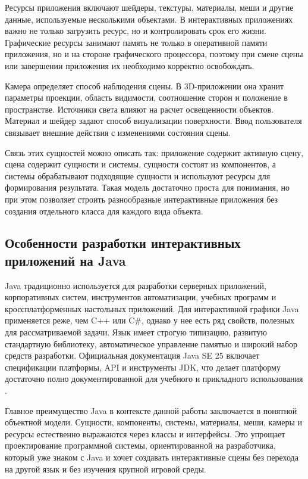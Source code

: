 Ресурсы приложения включают шейдеры, текстуры, материалы, меши и другие
данные, используемые несколькими объектами. В интерактивных приложениях
важно не только загрузить ресурс, но и контролировать срок его жизни.
Графические ресурсы занимают память не только в оперативной памяти
приложения, но и на стороне графического процессора, поэтому при смене
сцены или завершении приложения их необходимо корректно освобождать.

Камера определяет способ наблюдения сцены. В 3D-приложении она хранит
параметры проекции, область видимости, соотношение сторон и положение в
пространстве. Источники света влияют на расчет освещенности объектов.
Материал и шейдер задают способ визуализации поверхности. Ввод
пользователя связывает внешние действия с изменениями состояния сцены.

Связь этих сущностей можно описать так: приложение содержит активную
сцену, сцена содержит сущности и системы, сущности состоят из компонентов,
а системы обрабатывают подходящие сущности и используют ресурсы для
формирования результата. Такая модель достаточно проста для понимания, но
при этом позволяет строить разнообразные интерактивные приложения без
создания отдельного класса для каждого вида объекта.

\subsection{Особенности разработки интерактивных приложений на Java}

Java традиционно используется для разработки серверных приложений,
корпоративных систем, инструментов автоматизации, учебных программ и
кроссплатформенных настольных приложений. Для интерактивной графики Java
применяется реже, чем C++ или C\#, однако у нее есть ряд свойств, полезных
для рассматриваемой задачи. Язык имеет строгую типизацию, развитую
стандартную библиотеку, автоматическое управление памятью и широкий набор
средств разработки. Официальная документация Java SE 25 включает
спецификации платформы, API и инструменты JDK, что делает платформу
достаточно полно документированной для учебного и прикладного
использования \cite{oracle-java25}.

Главное преимущество Java в контексте данной работы заключается в
понятной объектной модели. Сущности, компоненты, системы, материалы,
меши, камеры и ресурсы естественно выражаются через классы и интерфейсы.
Это упрощает проектирование программной системы, ориентированной на
разработчика, который уже знаком с Java и хочет создавать интерактивные
сцены без перехода на другой язык и без изучения крупной игровой среды.

